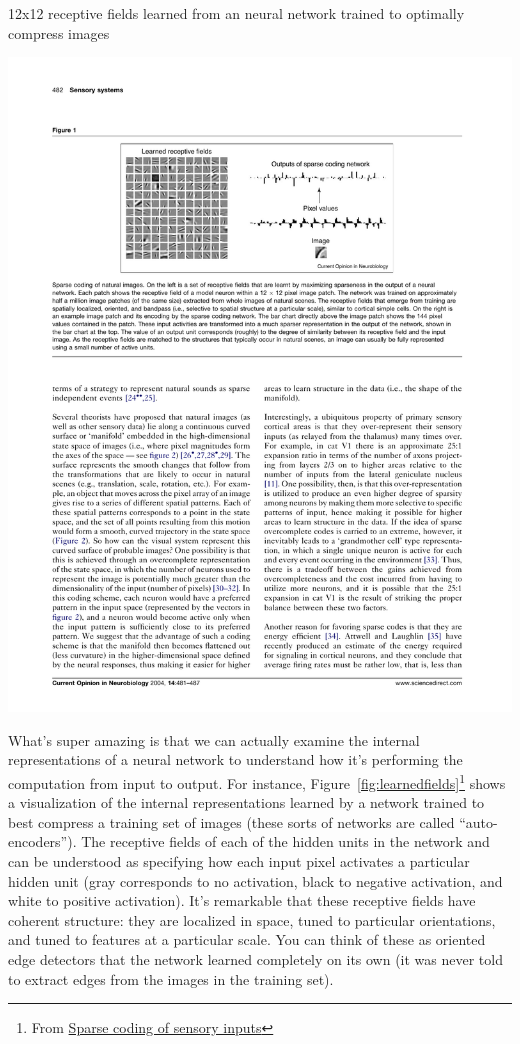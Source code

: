 \documentclass[assignment01_Solutions]{subfiles}
\begin{document}
\begin{marginfigure}

\caption{12x12 receptive fields learned from an neural network trained to optimally compress images}
\includegraphics[width=\linewidth]{figures/learned_receptive_fields}\label{fig:learnedfields}
\end{marginfigure}
What's super amazing is that we can actually examine the internal representations of a neural network to understand how it's performing the computation from input to output. For instance, Figure~\ref{fig:learnedfields}\footnote{From \href{http://www.cnbc.cmu.edu/~tai/nc19journalclubs/Olshausen-Field-CON-2004-1.pdf}{Sparse coding of sensory inputs}} shows a visualization of the internal representations learned by a network trained to best compress a training set of images (these sorts of networks are called ``auto-encoders'').  The receptive fields of each of the hidden units in the network and can be understood as specifying how each input pixel activates a particular hidden unit (gray corresponds to no activation, black to negative activation, and white to positive activation).  It's remarkable that these receptive fields have coherent structure: they are localized in space, tuned to particular orientations, and tuned to features at a particular scale.  You can think of these as oriented edge detectors that the network learned completely on its own (it was never told to extract edges from the images in the training set).
\end{document}
